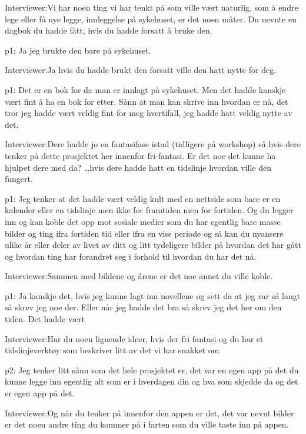 \documentclass[11pt, norsk, a4paper]{article}
\begin{document}
\textcolor{myBlue} {Interviewer:}Vi har noen ting vi har tenkt på som ville vært naturlig, som å endre lege eller få nye legge, innleggelse på sykehuset, er det noen måter. Du nevnte en dagbok du hadde fått, hvis du hadde forsatt å bruke den.

\textcolor{myGreen} {p1:} Ja jeg brukte den bare på sykehuset.

\textcolor{myBlue} {Interviewer:}Ja hvis du hadde brukt den forsatt ville den hatt nytte for deg.

\textcolor{myGreen} {p1:} Det er en bok for da man er innlagt på sykehuset. Men det hadde kanskje vært fint å ha en bok for etter. Sånn at man kan skrive inn hvordan er nå, det tror jeg hadde vært veldig fint for meg hvertifall, jeg hadde hatt veldig nytte av det.

\textcolor{myBlue} {Interviewer:}Dere hadde jo en fantasifase istad (tidligere på workshop) så hvis dere tenker på dette prosjektet her innenfor fri-fantasi. Er det noe det kunne ha hjulpet dere med da? \dots hvis dere hadde hatt en tidslinje hvordan ville den fungert.

\textcolor{myGreen} {p1:} Jeg tenker at det hadde vært veldig kult med en nettside som bare er en kalender eller en tidslinje men ikke for framtiden men for fortiden. Og du legger inn og kan koble det opp mot sosiale medier som du har egentlig bare masse bilder og ting ifra fortiden tid eller ifra en viss periode og så kan du nyansere ulike år eller deler av livet av ditt og litt tydeligere bilder på hvordan det har gått og hvordan ting har forandret seg i forhold til hvordan du har det nå.

\textcolor{myBlue} {Interviewer:}Sammen med bildene og årene er det noe annet du ville koble. 

\textcolor{myGreen} {p1:} Ja kanskje det, hvis jeg kunne lagt inn novellene og sett da at jeg var så langt så skrev jeg noe der. Eller når jeg hadde det bra så skrev jeg det her om den tiden. Det hadde vært

\textcolor{myBlue} {Interviewer:}Har du noen lignende ideer, hvis der fri fantasi og du har et tidslinjeverktøy som beskriver litt av det vi har snakket om

\textcolor{myYellow} {p2:} Jeg tenker litt sånn som det hele prosjektet er, det var en egen app på det du kunne legge inn egentlig alt som er i hverdagen din og hva som skjedde da og det er egen app på det. 

\textcolor{myBlue} {Interviewer:}Og når du tenker på innenfor den appen er det, det var nevnt bilder er det noen andre ting du kommer på i farten som du ville taste inn på appen.
\end{document}
